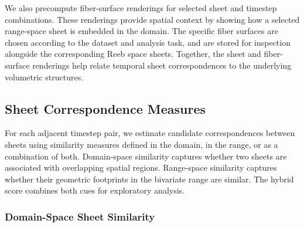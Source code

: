 \documentclass{vgtc}                          %
\begin{document}
We also precompute fiber-surface renderings for selected sheet and timestep combinations. These renderings provide spatial context by showing how a selected range-space sheet is embedded in the domain. The specific fiber surfaces are chosen according to the dataset and analysis task, and are stored for inspection alongside the corresponding Reeb space sheets. Together, the sheet and fiber-surface renderings help relate temporal sheet correspondences to the underlying volumetric structures.

\subsection{Sheet Correspondence Measures}
For each adjacent timestep pair, we estimate candidate correspondences between sheets using similarity measures defined in the domain, in the range, or as a combination of both. Domain-space similarity captures whether two sheets are associated with overlapping spatial regions. Range-space similarity captures whether their geometric footprints in the bivariate range are similar. The hybrid score combines both cues for exploratory analysis.

\subsubsection{Domain-Space Sheet Similarity}
\end{document}
